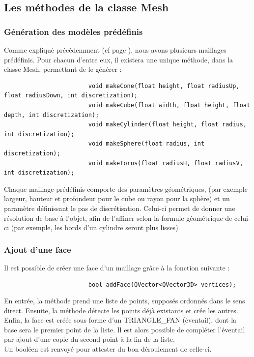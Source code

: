 \documentclass[a4paper]{memoir}
\begin{document}
			\subsection{Les méthodes de la classe Mesh}
				\label{mesh-dev}
				\subsubsection{Génération des modèles prédéfinis}
					Comme expliqué précédemment (cf page \pageref{model-cdc}), nous avons plusieurs maillages prédéfinis. Pour chacun d'entre eux, 
					il existera une unique méthode, dans la classe Mesh, permettant de le générer :
					\begin{verbatim}
						void makeCone(float height, float radiusUp, float radiusDown, int discretization);
						void makeCube(float width, float height, float depth, int discretization);
						void makeCylinder(float height, float radius, int discretization);
						void makeSphere(float radius, int discretization);
						void makeTorus(float radiusH, float radiusV, int discretization);
					\end{verbatim}
					Chaque maillage prédéfinis comporte des paramètres géométriques, (par exemple largeur, hauteur et profondeur pour le cube ou rayon pour 
					la sphère) et un paramètre définissant le pas de discrétisation. Celui-ci permet de donner une résolution de base à l'objet, afin de 
					l'affiner selon la formule géométrique de celui-ci (par exemple, les bords d'un cylindre seront plus lisses).
					
				\subsubsection{Ajout d'une face}
					Il est possible de créer une face d'un maillage grâce à la fonction suivante :
					\begin{verbatim}
						bool addFace(QVector<QVector3D> vertices);
					\end{verbatim}
					En entrée, la méthode prend une liste de points, supposés ordonnés dans le sens direct. Ensuite, la méthode détecte les points déjà 
					existants et crée les autres. Enfin, la face est créée sous forme d'un TRIANGLE\_FAN (éventail), dont la base sera le premier point 
					de la liste. Il est alors possible de compléter l'éventail par ajout d'une copie du second point à la fin de la liste.\\
					Un booléen est renvoyé pour attester du bon déroulement de celle-ci.
					
\end{document}
